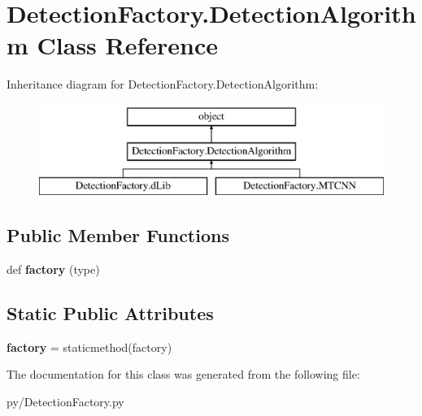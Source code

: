 \hypertarget{classDetectionFactory_1_1DetectionAlgorithm}{}\section{Detection\+Factory.\+Detection\+Algorithm Class Reference}
\label{classDetectionFactory_1_1DetectionAlgorithm}
Inheritance diagram for Detection\+Factory.\+Detection\+Algorithm\+:\begin{figure}[H]
\begin{center}
\leavevmode
\includegraphics[height=3.000000cm]{classDetectionFactory_1_1DetectionAlgorithm}
\end{center}
\end{figure}
\subsection*{Public Member Functions}
\begin{DoxyCompactItemize}
\item 
def {\bfseries factory} (type)\hypertarget{classDetectionFactory_1_1DetectionAlgorithm_adc7c8e0fd68b235903e55e6f0f13d34a}{}\label{classDetectionFactory_1_1DetectionAlgorithm_adc7c8e0fd68b235903e55e6f0f13d34a}

\end{DoxyCompactItemize}
\subsection*{Static Public Attributes}
\begin{DoxyCompactItemize}
\item 
{\bfseries factory} = staticmethod(factory)\hypertarget{classDetectionFactory_1_1DetectionAlgorithm_aa36820a251819efa6ea1eb7202b270b1}{}\label{classDetectionFactory_1_1DetectionAlgorithm_aa36820a251819efa6ea1eb7202b270b1}

\end{DoxyCompactItemize}


The documentation for this class was generated from the following file\+:\begin{DoxyCompactItemize}
\item 
py/Detection\+Factory.\+py\end{DoxyCompactItemize}
